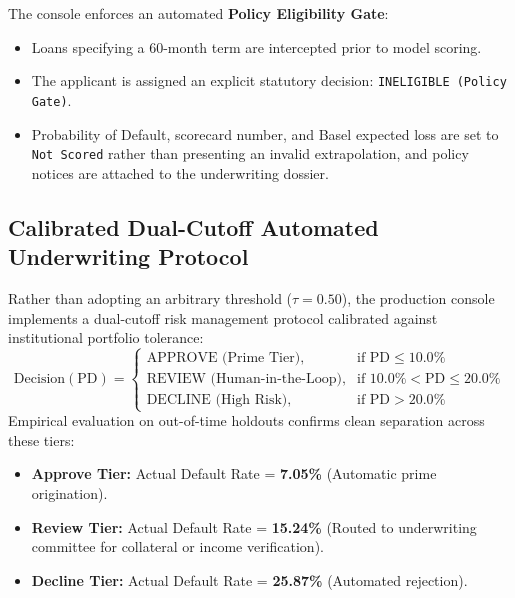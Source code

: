 \documentclass[conference]{IEEEtran}
\begin{document}
The console enforces an automated \textbf{Policy Eligibility Gate}:
\begin{itemize}
    \item Loans specifying a 60-month term are intercepted prior to model scoring.
    \item The applicant is assigned an explicit statutory decision: \texttt{INELIGIBLE (Policy Gate)}.
    \item Probability of Default, scorecard number, and Basel expected loss are set to \texttt{Not Scored} rather than presenting an invalid extrapolation, and policy notices are attached to the underwriting dossier.
\end{itemize}

\subsection{Calibrated Dual-Cutoff Automated Underwriting Protocol}
Rather than adopting an arbitrary threshold ($\tau = 0.50$), the production console implements a dual-cutoff risk management protocol calibrated against institutional portfolio tolerance:
\begin{equation}
\text{Decision}(\text{PD}) = \begin{cases} 
\text{APPROVE (Prime Tier)}, & \text{if } \text{PD} \le 10.0\% \\ 
\text{REVIEW (Human-in-the-Loop)}, & \text{if } 10.0\% < \text{PD} \le 20.0\% \\ 
\text{DECLINE (High Risk)}, & \text{if } \text{PD} > 20.0\% 
\end{cases}
\end{equation}
Empirical evaluation on out-of-time holdouts confirms clean separation across these tiers:
\begin{itemize}
    \item \textbf{Approve Tier:} Actual Default Rate = \textbf{7.05\%} (Automatic prime origination).
    \item \textbf{Review Tier:} Actual Default Rate = \textbf{15.24\%} (Routed to underwriting committee for collateral or income verification).
    \item \textbf{Decline Tier:} Actual Default Rate = \textbf{25.87\%} (Automated rejection).
\end{itemize}
\end{document}

